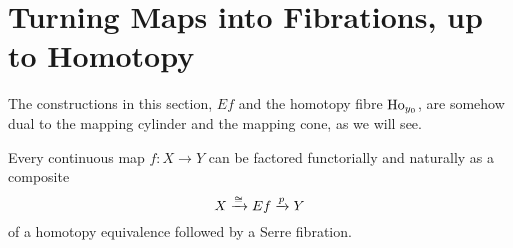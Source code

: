 \section{Turning Maps into Fibrations, up to Homotopy}

The constructions in this section, $Ef$ and the homotopy fibre $\operatorname{Ho}_{y_0}$, are somehow dual to the mapping cylinder and the mapping cone, as we will see.

\begin{theorem}\label{theorem:factorization-equivalence-fibration}
Every continuous map $f:X\to Y$ can be factored functorially and naturally as a composite
\[X\xrightarrow{\cong}Ef\xrightarrow{p} Y\]
of a homotopy equivalence followed by a Serre fibration.
\end{theorem}

